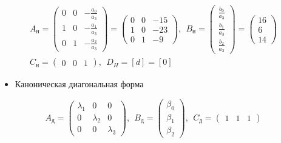 \begin{par}
$$\begin{array}{l}
A_н =\left(\begin{array}{ccc}
0 & 0 & -\frac{a_0 }{a_3 }\\
1 & 0 & -\frac{a_1 }{a_3 }\\
0 & 1 & -\frac{a_2 }{a_3 }
\end{array}\right)=\left(\begin{array}{ccc}
0 & 0 & -15\\
1 & 0 & -23\\
0 & 1 & -9
\end{array}\right),~~B_н =\left(\begin{array}{c}
\frac{b_0 }{a_3 }\\
\frac{b_1 }{a_3 }\\
\frac{b_2 }{a_3 }
\end{array}\right)=\left(\begin{array}{c}
16\\
6\\
14
\end{array}\right)\\
C_н =\left(\begin{array}{ccc}
0 & 0 & 1
\end{array}\right),~~D_H =[d]=[0]
\end{array}$$
\end{par}

\begin{itemize}
\setlength{\itemsep}{-1ex}
   \item{\begin{flushleft} Каноническая диагональная форма \end{flushleft}}
\end{itemize}

\begin{par}
$$A_д =\left(\begin{array}{ccc}
\lambda_1  & 0 & 0\\
0 & \lambda_2  & 0\\
0 & 0 & \lambda_3 
\end{array}\right),~~B_д =\left(\begin{array}{c}
\beta_0 \\
\beta_1 \\
\beta_2 
\end{array}\right),~~C_д =\left(\begin{array}{ccc}
1 & 1 & 1
\end{array}\right)$$
\end{par}

